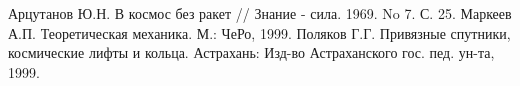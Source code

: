 \begin{thebibliography}{99}
\bibitem{} Арцутанов Ю.Н. В космос без ракет // Знание - сила. 1969. No 7. С. 25.
\bibitem{} Маркеев А.П. Теоретическая механика. М.: ЧеРо, 1999. 
\bibitem{} Поляков Г.Г. Привязные спутники, космические лифты и кольца. Астрахань: Изд-во
Астраханского гос. пед. ун-та, 1999. 
\end{thebibliography}